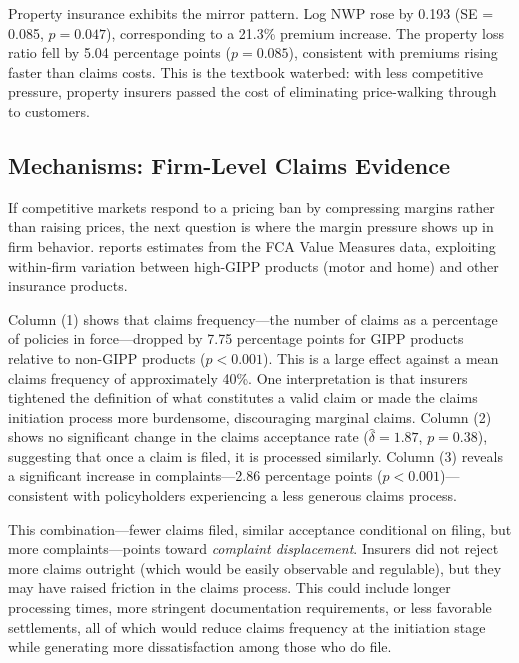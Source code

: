 \documentclass[12pt]{article}
\begin{document}
Property insurance exhibits the mirror pattern. Log NWP rose by 0.193 (SE = 0.085, $p = 0.047$), corresponding to a 21.3\% premium increase. The property loss ratio fell by 5.04 percentage points ($p = 0.085$), consistent with premiums rising faster than claims costs. This is the textbook waterbed: with less competitive pressure, property insurers passed the cost of eliminating price-walking through to customers.



\subsection{Mechanisms: Firm-Level Claims Evidence}

If competitive markets respond to a pricing ban by compressing margins rather than raising prices, the next question is where the margin pressure shows up in firm behavior.  reports estimates from the FCA Value Measures data, exploiting within-firm variation between high-GIPP products (motor and home) and other insurance products.

Column (1) shows that claims frequency---the number of claims as a percentage of policies in force---dropped by 7.75 percentage points for GIPP products relative to non-GIPP products ($p < 0.001$). This is a large effect against a mean claims frequency of approximately 40\%. One interpretation is that insurers tightened the definition of what constitutes a valid claim or made the claims initiation process more burdensome, discouraging marginal claims. Column (2) shows no significant change in the claims acceptance rate ($\hat{\delta} = 1.87$, $p = 0.38$), suggesting that once a claim is filed, it is processed similarly. Column (3) reveals a significant increase in complaints---2.86 percentage points ($p < 0.001$)---consistent with policyholders experiencing a less generous claims process.

This combination---fewer claims filed, similar acceptance conditional on filing, but more complaints---points toward \textit{complaint displacement}. Insurers did not reject more claims outright (which would be easily observable and regulable), but they may have raised friction in the claims process. This could include longer processing times, more stringent documentation requirements, or less favorable settlements, all of which would reduce claims frequency at the initiation stage while generating more dissatisfaction among those who do file.
\end{document}

